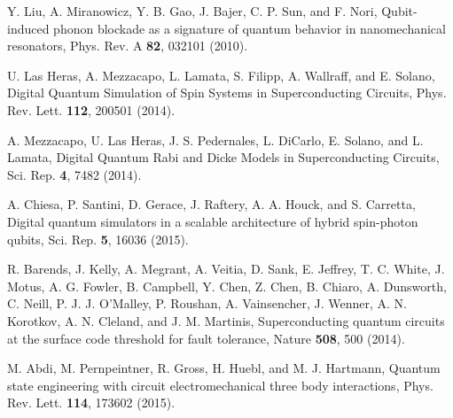 \documentclass[aps,twocolumn,groupedaddress,superscriptaddress,floatfix,amsmath,amssymb,prb]{revtex4-1}
\begin{document}
\begin{thebibliography}{99}
{Y. Liu, A. Miranowicz, Y. B. Gao, J. Bajer, C. P. Sun, and F. Nori,
{Qubit-induced phonon blockade as a signature of quantum behavior in nanomechanical resonators}, 
Phys. Rev. A \textbf{82}, 032101 (2010).}



U. Las Heras, A. Mezzacapo, L. Lamata, S. Filipp, A. Wallraff, and E. Solano,
{Digital Quantum Simulation of Spin Systems in Superconducting Circuits},
Phys. Rev. Lett. {\bf 112}, 200501 (2014).

A. Mezzacapo, U. Las Heras, J. S. Pedernales, L. DiCarlo, E. Solano, and L. Lamata,
{Digital Quantum Rabi and Dicke Models in Superconducting Circuits},
Sci. Rep. {\bf 4}, 7482 (2014).

A. Chiesa, P. Santini, D. Gerace, J. Raftery, A. A. Houck, and S. Carretta,
{Digital quantum simulators in a scalable architecture of hybrid spin-photon qubits},
Sci. Rep. {\bf 5}, 16036 (2015).

{R. Barends, J. Kelly, A. Megrant, A. Veitia, D. Sank, E. Jeffrey, T. C. White, J. Motus, A. G. Fowler, 
B. Campbell, Y. Chen, Z. Chen, B. Chiaro, A. Dunsworth, C. Neill, P. J. J. O'Malley, P. Roushan, A. Vainsencher, 
J. Wenner, A. N. Korotkov, A. N. Cleland, and J. M. Martinis,
Superconducting quantum circuits at the surface code threshold for fault tolerance,
Nature {\bf 508}, 500 (2014).}

M. Abdi, M. Pernpeintner, R. Gross, H. Huebl, and M. J. Hartmann, 
{Quantum state engineering with circuit electromechanical three body interactions}, 
Phys. Rev. Lett. \textbf{114}, 173602 (2015).


\end{thebibliography}
\end{document}
